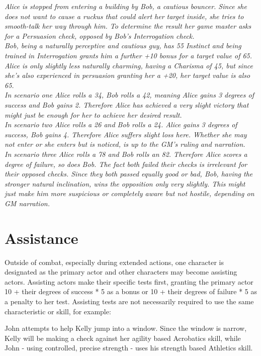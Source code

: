 \documentclass[12pt,a4paper,openany]{book}
\newenvironment{exampleblock}[1][1]
{\par\hfill\begin{minipage}{\dimexpr\textwidth-#1cm}}
{\end{minipage}\par}
\begin{document}
	\begin{exampleblock}\textit{
	Alice is stopped from entering a building by Bob, a cautious bouncer. Since she does not want to cause a ruckus that could alert her target inside, she tries to smooth-talk her way through him. To determine the result her game master asks for a Persuasion check, opposed by Bob’s Interrogation check.\\
	Bob, being a naturally perceptive and cautious guy, has 55 Instinct and being trained in Interrogation grants him a further +10 bonus for a target value of 65. Alice is only slightly less naturally charming, having a Charisma of 45, but since she’s also experienced in persuasion granting her a +20, her target value is also 65.\\
	In scenario one Alice rolls a 34, Bob rolls a 42, meaning Alice gains 3 degrees of success and Bob gains 2. Therefore Alice has achieved a very slight victory that might just be enough for her to achieve her desired result.\\
	In scenario two Alice rolls a 26 and Bob rolls a 24. Alice gains 3 degrees of success, Bob gains 4. Therefore Alice suffers slight loss here. Whether she may not enter or she enters but is noticed, is up to the GM’s ruling and narration.\\
	In scenario three Alice rolls a 78 and Bob rolls an 82. Therefore Alice scores a degree of failure, so does Bob. The fact both failed their checks is irrelevant for their opposed checks. Since they both passed equally good or bad, Bob, having the stronger natural inclination, wins the opposition only very slightly. This might just make him more suspicious or completely aware but not hostile, depending on GM narration.\\
		}
	\end{exampleblock}

	\section{Assistance}
	Outside of combat, especially during extended actions, one character is designated as the primary actor and other characters may become assisting actors. Assisting actors make their specific tests first, granting the primary actor 10 + their degrees of success * 5 as a bonus or 10 + their degrees of failure * 5 as a penalty to her test. Assisting tests are not necessarily required to use the same characteristic or skill, for example:\par
	\begin{exampleblock}
		John attempts to help Kelly jump into a window. Since the window is narrow, Kelly will be making a check against her agility based Acrobatics skill, while John - using controlled, precise strength - uses his strength based Athletics skill.
	\end{exampleblock}
\end{document}
